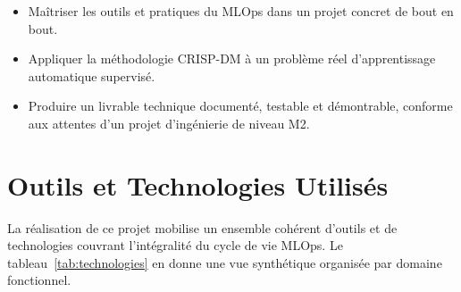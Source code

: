 \documentclass{rapportENSIAS}
\begin{document}
\begin{itemize}
    \item Maîtriser les outils et pratiques du MLOps dans un projet concret de bout en bout.
    \item Appliquer la méthodologie CRISP-DM à un problème réel d'apprentissage automatique supervisé.
    \item Produire un livrable technique documenté, testable et démontrable, conforme aux attentes d'un projet d'ingénierie de niveau M2.
\end{itemize}

\section{Outils et Technologies Utilisés}

La réalisation de ce projet mobilise un ensemble cohérent d'outils et de technologies couvrant l'intégralité du cycle de vie MLOps. Le tableau~\ref{tab:technologies} en donne une vue synthétique organisée par domaine fonctionnel.
\end{document}
